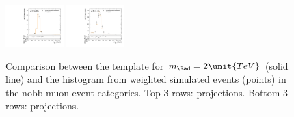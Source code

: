 \begin{figure}[htpb]
  \includegraphics[width=0.2\textwidth]{fig/analysisAppendix/templateVsReco_RadToWW2000_r0_MJ_mu_HP_vbf_HDy.pdf}
  \includegraphics[width=0.2\textwidth]{fig/analysisAppendix/templateVsReco_RadToWW2000_r0_MJ_mu_LP_vbf_HDy.pdf}\\
  \caption{
    Comparison between the \ggF\RadtoWW template for $m_{\Rad}=2\unit{TeV}$ (solid line) and the histogram from weighted simulated events (points) in the nobb muon event categories.
    Top 3 rows: \MVV projections.
    Bottom 3 rows: \MJ projections.
  }
  \label{fig:1dtemplateVsReco_RadToWW2000}
\end{figure}

